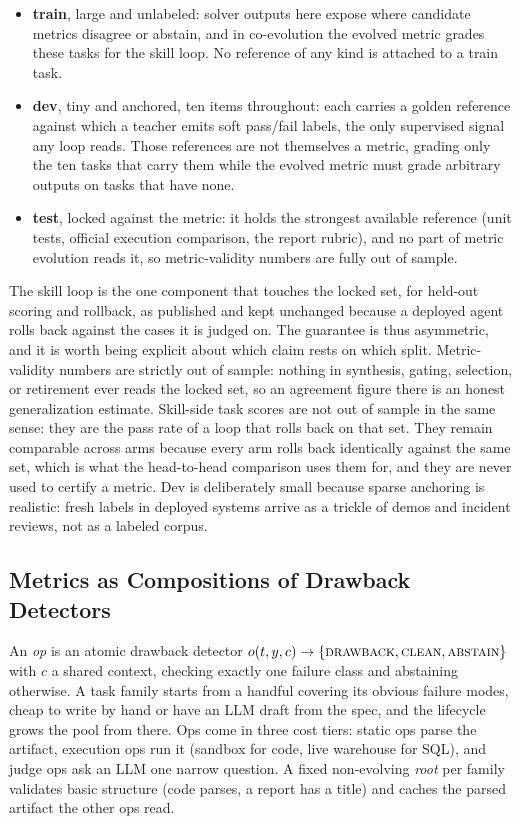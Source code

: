 \documentclass[letterpaper]{article} %
\begin{document}
\begin{itemize}
\item \textbf{train}, large and unlabeled: solver outputs here expose where candidate metrics disagree or abstain, and in co-evolution the evolved metric grades these tasks for the skill loop. No reference of any kind is attached to a train task.
\item \textbf{dev}, tiny and anchored, ten items throughout: each carries a golden reference against which a teacher emits soft pass/fail labels, the only supervised signal any loop reads. Those references are not themselves a metric, grading only the ten tasks that carry them while the evolved metric must grade arbitrary outputs on tasks that have none.
\item \textbf{test}, locked against the metric: it holds the strongest available reference (unit tests, official execution comparison, the report rubric), and no part of metric evolution reads it, so metric-validity numbers are fully out of sample.
\end{itemize}

The skill loop is the one component that touches the locked set, for held-out scoring and rollback, as published \citep{zhang2026ratchet} and kept unchanged because a deployed agent rolls back against the cases it is judged on. The guarantee is thus asymmetric, and it is worth being explicit about which claim rests on which split. Metric-validity numbers are strictly out of sample: nothing in synthesis, gating, selection, or retirement ever reads the locked set, so an agreement figure there is an honest generalization estimate. Skill-side task scores are not out of sample in the same sense: they are the pass rate of a loop that rolls back on that set. They remain comparable across arms because every arm rolls back identically against the same set, which is what the head-to-head comparison uses them for, and they are never used to certify a metric. Dev is deliberately small because sparse anchoring is realistic: fresh labels in deployed systems arrive as a trickle of demos and incident reviews, not as a labeled corpus.

\subsection{Metrics as Compositions of Drawback Detectors}

An \emph{op} is an atomic drawback detector $o(t, y, c) \rightarrow \{\textsc{drawback}, \textsc{clean}, \textsc{abstain}\}$ with $c$ a shared context, checking exactly one failure class and abstaining otherwise. A task family starts from a handful covering its obvious failure modes, cheap to write by hand or have an LLM draft from the spec, and the lifecycle grows the pool from there. Ops come in three cost tiers: static ops parse the artifact, execution ops run it (sandbox for code, live warehouse for SQL), and judge ops ask an LLM one narrow question. A fixed non-evolving \emph{root} per family validates basic structure (code parses, a report has a title) and caches the parsed artifact the other ops read.
\end{document}
